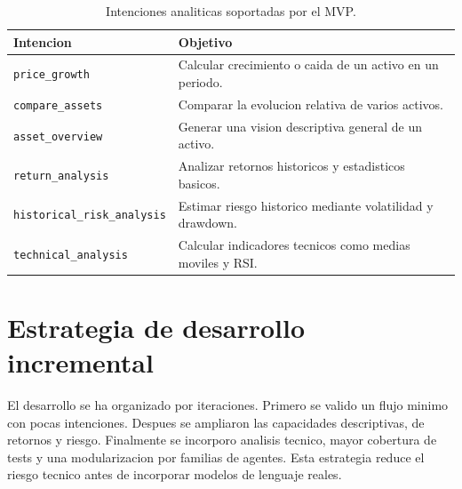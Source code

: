 \begin{table}[h]
\centering
\begin{tabularx}{\textwidth}{lX}
\toprule
\textbf{Intencion} & \textbf{Objetivo} \\
\midrule
\texttt{price\_growth} & Calcular crecimiento o caida de un activo en un periodo. \\
\texttt{compare\_assets} & Comparar la evolucion relativa de varios activos. \\
\texttt{asset\_overview} & Generar una vision descriptiva general de un activo. \\
\texttt{return\_analysis} & Analizar retornos historicos y estadisticos basicos. \\
\texttt{historical\_risk\_analysis} & Estimar riesgo historico mediante volatilidad y drawdown. \\
\texttt{technical\_analysis} & Calcular indicadores tecnicos como medias moviles y RSI. \\
\bottomrule
\end{tabularx}
\caption{Intenciones analiticas soportadas por el MVP.}
\end{table}

\section{Estrategia de desarrollo incremental}

El desarrollo se ha organizado por iteraciones. Primero se valido un flujo minimo con pocas intenciones. Despues se ampliaron las capacidades descriptivas, de retornos y riesgo. Finalmente se incorporo analisis tecnico, mayor cobertura de tests y una modularizacion por familias de agentes. Esta estrategia reduce el riesgo tecnico antes de incorporar modelos de lenguaje reales.

